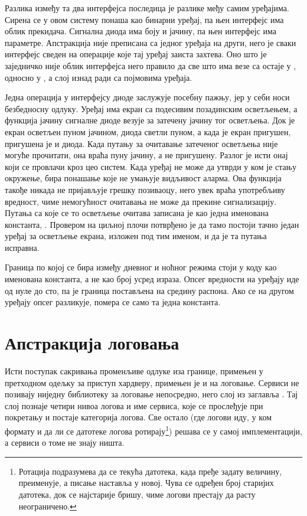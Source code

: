 \documentclass[12pt,oneside]{memoir}
\begin{document}
Разлика између та два интерфејса последица је разлике међу самим уређајима. Сирена се у овом систему понаша као бинарни
уређај, па њен интерфејс има облик прекидача. Сигнална диода има боју и јачину, па њен
интерфејс има параметре. Апстракција није преписана са једног уређаја на други, него је
сваки интерфејс сведен на операције које тај уређај заиста захтева. Оно што је заједничко није облик интерфејса него
правило да све што има везе са  остаје у , односно у ,
а слој изнад ради са појмовима уређаја.

Једна операција у интерфејсу диоде заслужује посебну пажњу, јер у себи носи безбедносну
одлуку. Уређај има екран са подесивим позадинским осветљењем, а функција 
 јачину сигналне диоде везује за затечену јачину тог осветљења. Док је екран осветљен пуном јачином,
  диода светли пуном, а када је екран пригушен, пригушена је и диода. Када путању за очитавање
затеченог осветљења није могуће прочитати, она враћа пуну јачину, а не пригушену.
Разлог је исти онај који се провлачи кроз цео систем. Када уређај не може да утврди у ком
је стању окружење, бира понашање које не умањује видљивост аларма. Ова функција такође
никада не пријављује грешку позиваоцу, него увек враћа употребљиву вредност, чиме
немогућност очитавања не може да прекине сигнализацију.
Путања са које се то осветљење очитава записана је као једна именована константа,
. Провером на циљној плочи потврђено је
да тамо постоји тачно један уређај за осветљење екрана, изложен под тим именом, и да је та
путања исправна.

Граница по којој се бира између дневног и ноћног режима стоји у коду као именована
константа, а не као број усред израза. Опсег вредности на уређају иде од нуле до сто, па је
граница постављена на средину распона. Ако се на другом уређају опсег разликује, помера се
само та једна константа.

\section{Апстракција логовања}
\label{sec:log}

Исти поступак сакривања променљиве одлуке иза границе, примењен у претходном одељку за приступ хардверу,
 примењен је и на логовање.
Сервиси не позивају ниједну библиотеку за
логовање непосредно, него слој  из заглавља
. Тај слој познаје четири нивоа логова и име сервиса, које се
прослеђује при покретању и постаје категорија логова. Све остало (где логови иду, у ком
формату и да ли се датотеке логова ротирају\footnote{Ротација подразумева да се текућа датотека,
када пређе задату величину, преименује, а писање наставља у новој. Чува се одређен број
старијих датотека, док се најстарије бришу, чиме логови престају да расту неограничено.})
решава се у самој имплементацији, а сервиси о томе не знају ништа.
\end{document}
